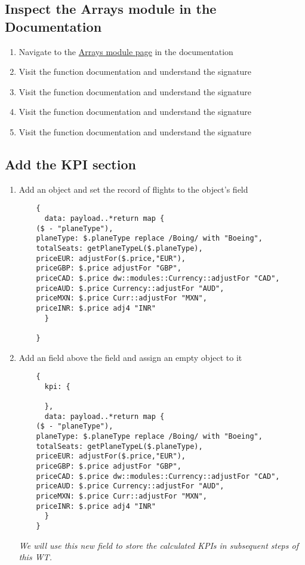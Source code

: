 \subsection{Inspect the Arrays module in the Documentation}
\begin{enumerate}
\item Navigate to the \href{https://docs.mulesoft.com/mule-runtime/4.3/dw-arrays}{Arrays module page} in the documentation
\item Visit the  function documentation and understand the signature
\item Visit the  function documentation and understand the signature
\item Visit the  function documentation and understand the signature
\item Visit the  function documentation and understand the signature
\end{enumerate}

\subsection{Add the KPI section}
\begin{enumerate}[resume*]
\item Add an object and set the record of flights to the object's  field
  \begin{verbatim}
    {
      data: payload..*return map {
	($ - "planeType"),
	planeType: $.planeType replace /Boing/ with "Boeing",
	totalSeats: getPlaneTypeL($.planeType),
	priceEUR: adjustFor($.price,"EUR"),
	priceGBP: $.price adjustFor "GBP",
	priceCAD: $.price dw::modules::Currency::adjustFor "CAD",
	priceAUD: $.price Currency::adjustFor "AUD",
	priceMXN: $.price Curr::adjustFor "MXN",
	priceINR: $.price adj4 "INR"
      }
      
    }
  \end{verbatim}
\item Add an  field above the  field and assign an empty object to it
  \begin{verbatim}
    {
      kpi: {
	
      },
      data: payload..*return map {
	($ - "planeType"),
	planeType: $.planeType replace /Boing/ with "Boeing",
	totalSeats: getPlaneTypeL($.planeType),
	priceEUR: adjustFor($.price,"EUR"),
	priceGBP: $.price adjustFor "GBP",
	priceCAD: $.price dw::modules::Currency::adjustFor "CAD",
	priceAUD: $.price Currency::adjustFor "AUD",
	priceMXN: $.price Curr::adjustFor "MXN",
	priceINR: $.price adj4 "INR"
      }
    }
  \end{verbatim}
  \emph{
    We will use this new field to store the calculated KPIs in subsequent steps of this WT.
  }
\end{enumerate}

